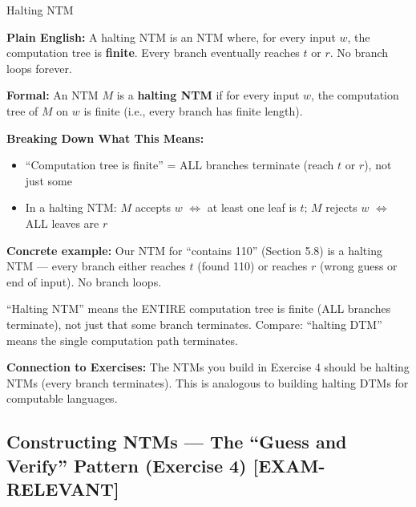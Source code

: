 \documentclass[11pt,a4paper]{article}
\newcommand{\kemark}{\textcolor{red!70!black}{\textbf{[EXAM-RELEVANT]}}}
\newcommand{\kt}[1]{\par\vspace{0.3em}\colorbox{yellow!60}{\parbox{\dimexpr\linewidth-2\fboxsep}{#1}}\vspace{0.3em}}
\begin{document}
\begin{definitionbox}{Halting NTM}

\textbf{Plain English:} A halting NTM is an NTM where, for every input $w$, the computation tree is \textbf{finite}. Every branch eventually reaches $t$ or $r$. No branch loops forever.

\textbf{Formal:} An NTM $M$ is a \textbf{halting NTM} if for every input $w$, the computation tree of $M$ on $w$ is finite (i.e., every branch has finite length).

\textbf{Breaking Down What This Means:}
\begin{itemize}[nosep]
\item ``Computation tree is finite'' = ALL branches terminate (reach $t$ or $r$), not just some
\item In a halting NTM: $M$ accepts $w$ $\Leftrightarrow$ at least one leaf is $t$; $M$ rejects $w$ $\Leftrightarrow$ ALL leaves are $r$
\end{itemize}

\textbf{Concrete example:} Our NTM for ``contains 110'' (Section 5.8) is a halting NTM --- every branch either reaches $t$ (found 110) or reaches $r$ (wrong guess or end of input). No branch loops.

\kt{``Halting NTM'' means the ENTIRE computation tree is finite (ALL branches terminate), not just that some branch terminates. Compare: ``halting DTM'' means the single computation path terminates.}

\textbf{Connection to Exercises:} The NTMs you build in Exercise 4 should be halting NTMs (every branch terminates). This is analogous to building halting DTMs for computable languages.
\end{definitionbox}


\subsection{Constructing NTMs --- The ``Guess and Verify'' Pattern (Exercise 4) \kemark}
\end{document}
